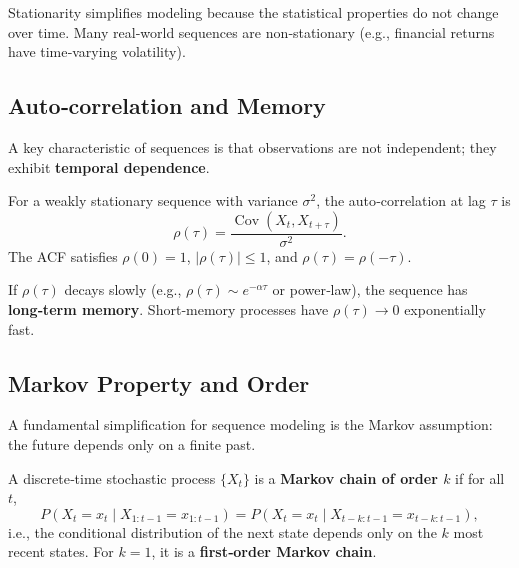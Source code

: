 \documentclass{tufte-handout}
\begin{document}
Stationarity simplifies modeling because the statistical properties do not change over time. Many real‑world sequences are non‑stationary (e.g., financial returns have time‑varying volatility).

\subsection{Auto‑correlation and Memory}

A key characteristic of sequences is that observations are not independent; they exhibit \textbf{temporal dependence}.

\begin{defn}
    For a weakly stationary sequence with variance $\sigma^2$, the auto‑correlation at lag $\tau$ is
    \[
    \rho(\tau) = \frac{\operatorname{Cov}(X_t, X_{t+\tau})}{\sigma^2}.
    \]
    The ACF satisfies $\rho(0)=1$, $|\rho(\tau)|\le 1$, and $\rho(\tau)=\rho(-\tau)$.
\end{defn}

If $\rho(\tau)$ decays slowly (e.g., $\rho(\tau) \sim e^{-\alpha \tau}$ or power‑law), the sequence has \textbf{long‑term memory}. Short‑memory processes have $\rho(\tau) \to 0$ exponentially fast.

\begin{marginfigure}
\centering
{}
\end{marginfigure}

\subsection{Markov Property and Order}

A fundamental simplification for sequence modeling is the Markov assumption: the future depends only on a finite past.

\begin{defn}
    A discrete‑time stochastic process $\{X_t\}$ is a \textbf{Markov chain of order $k$} if for all $t$,
    \[
    P(X_t = x_t \mid X_{1:t-1} = x_{1:t-1}) = P(X_t = x_t \mid X_{t-k:t-1} = x_{t-k:t-1}),
    \]
    i.e., the conditional distribution of the next state depends only on the $k$ most recent states. For $k=1$, it is a \textbf{first‑order Markov chain}.
\end{defn}
\end{document}
